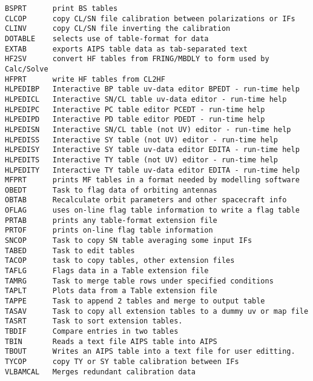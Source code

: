 \vskip 0.5pt
\bbve\begin{verbatim}
BSPRT      print BS tables
CLCOP      copy CL/SN file calibration between polarizations or IFs
CLINV      copy CL/SN file inverting the calibration
DOTABLE    selects use of table-format for data
EXTAB      exports AIPS table data as tab-separated text
HF2SV      convert HF tables from FRING/MBDLY to form used by Calc/Solve
HFPRT      write HF tables from CL2HF
HLPEDIBP   Interactive BP table uv-data editor BPEDT - run-time help
HLPEDICL   Interactive SN/CL table uv-data editor - run-time help
HLPEDIPC   Interactive PC table editor PCEDT - run-time help
HLPEDIPD   Interactive PD table editor PDEDT - run-time help
HLPEDISN   Interactive SN/CL table (not UV) editor - run-time help
HLPEDISS   Interactive SY table (not UV) editor - run-time help
HLPEDISY   Interactive SY table uv-data editor EDITA - run-time help
HLPEDITS   Interactive TY table (not UV) editor - run-time help
HLPEDITY   Interactive TY table uv-data editor EDITA - run-time help
MFPRT      prints MF tables in a format needed by modelling software
OBEDT      Task to flag data of orbiting antennas
OBTAB      Recalculate orbit parameters and other spacecraft info
OFLAG      uses on-line flag table information to write a flag table
PRTAB      prints any table-format extension file
PRTOF      prints on-line flag table information
SNCOP      Task to copy SN table averaging some input IFs
TABED      Task to edit tables
TACOP      task to copy tables, other extension files
TAFLG      Flags data in a Table extension file
TAMRG      Task to merge table rows under specified conditions
TAPLT      Plots data from a Table extension file
TAPPE      Task to append 2 tables and merge to output table
TASAV      Task to copy all extension tables to a dummy uv or map file
TASRT      Task to sort extension tables.
TBDIF      Compare entries in two tables
TBIN       Reads a text file AIPS table into AIPS
TBOUT      Writes an AIPS table into a text file for user editting.
TYCOP      copy TY or SY table calibration between IFs
VLBAMCAL   Merges redundant calibration data
\end{verbatim}\eve


